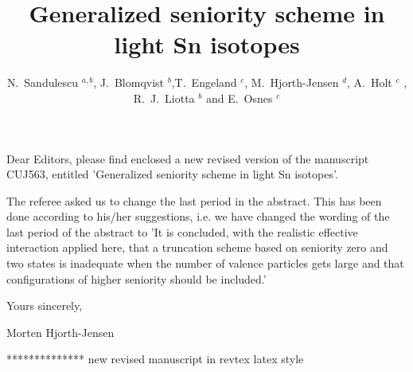 

Dear Editors, 
please find enclosed a new revised version of the 
manuscript CUJ563, entitled 
'Generalized seniority scheme in light Sn isotopes'.


The referee asked us to change the last period in the abstract.
This has been done according to his/her suggestions,
i.e. we have changed the wording of
the last period of the abstract to
'It is concluded, with the
realistic effective interaction applied here, that a truncation scheme
based on seniority zero and two states is inadequate when the 
number of valence particles gets large and 
that configurations of higher seniority
should be included.'



Yours sincerely,

Morten Hjorth-Jensen 





**************  new revised manuscript in revtex latex style




\title{Generalized seniority scheme in light Sn isotopes }


\author {N.\ Sandulescu $^{a,b}$, J.\ Blomqvist $^b$,T.\ Engeland $^c$, 
	M.\ Hjorth-Jensen $^d$, A.\ Holt $^c$ , R.\ J.\ Liotta $^b$ and 
        E.\ Osnes $^c$ }


\address{$^a$Institute of Atomic Physics, P.O.Box MG-6, Bucharest, Romania}

\address{$^b$Royal Institute of Technology, Physics Department
Frescati, S-10405, Stockholm,Sweden}

\address{$^c$Department of Physics, 
University of Oslo, N-0316 Oslo, Norway}

\address{$^d$Nordita, Blegdamsvej 17, DK-2100 K\o benhavn \O, Denmark}

\maketitle



